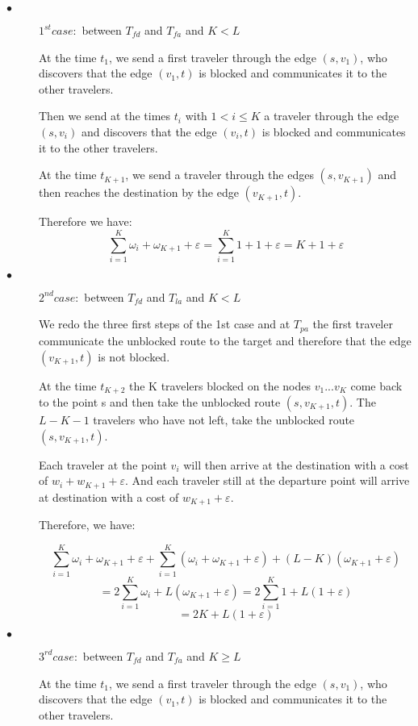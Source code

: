\documentclass[a4paper, 10pt]{article}
\begin{document}
\begin{description}
\item[$\bullet$] $1^{st} case:$ between $T_{fd}$ and $T_{fa}$ and $K<L$

At the time $t_1$, we send a first traveler through the edge $(s,v_1)$, who discovers that the edge $(v_1,t)$ is blocked and communicates it to the other travelers.

Then we send at the times $t_i$ with $1 < i \leq K$ a traveler through the edge $(s,v_i)$ and discovers that the edge $(v_i,t)$ is blocked and communicates it to the other travelers.

At the time $t_{K+1}$, we send a traveler through the edges $(s,v_{K+1})$ and then reaches the destination by the edge $(v_{K+1},t)$. 

Therefore we have: 
\[
\sum_{i=1}^{K} \omega_{i} + \omega_{K+1} + \varepsilon = \sum_{i=1}^{K} 1 + 1 + \varepsilon = K + 1 + \varepsilon
\]

\item[$\bullet$] $2^{nd} case:$ between $T_{fd}$ and $T_{la}$ and $K<L$

We redo the three first steps of the 1st case and at $ T_{pa} $ the first traveler communicate the unblocked route to the target and therefore that the edge $(v_{K+1},t)$ is not blocked.

At the time $t_{K+2}$ the K travelers blocked on the nodes $v_{1} ... v_K $ come back to the point s and then take the unblocked route $(s,v_{K+1},t)$. The $L-K-1$ travelers who have not left, take the unblocked route $(s,v_{K+1},t)$.

Each traveler at the point $v_i$ will then arrive at the destination with a cost of $w_i + w_{K+1} + \varepsilon$. And each traveler still at the departure point will arrive at destination with a cost of $w_{K+1} + \varepsilon$.

Therefore, we have:

\[
\sum_{i=1}^{K} \omega_{i} + \omega_{K+1} + \varepsilon + \sum_{i=1}^{K}(\omega_{i} + \omega_{K+1} + \varepsilon) + (L - K) ( \omega_{K+1} + \varepsilon )
\]
\[
 = 2\sum_{i=1}^{K} \omega_{i} + L(\omega_{K+1} + \varepsilon ) = 2\sum_{i=1}^{K} 1+ L(1 + \varepsilon )
\]
\[
 = 2K+ L(1 + \varepsilon )
\]

\item[$\bullet$] $3^{rd} case:$ between $T_{fd}$ and $T_{fa}$ and $K \geq L$

At the time $t_1$, we send a first traveler through the edge $(s,v_1)$, who discovers that the edge $(v_1,t)$ is blocked and communicates it to the other travelers.


\end{description}
\end{document}
